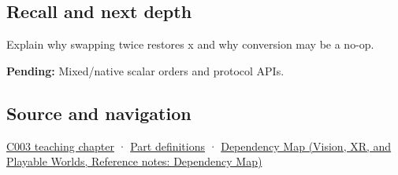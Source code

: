 \subsection{Recall and next depth}\label{appendix-11ba36693aa2-recall-and-next-depth}

Explain why swapping twice restores x and why conversion may be a no-op.

\textbf{Pending:} Mixed/native scalar orders and protocol APIs.

\subsection{Source and navigation}\label{appendix-11ba36693aa2-source-and-navigation}

\hyperref[01-foundations-i-ch002-where-the-bytes-live]{C003 teaching chapter} · \hyperref[appendix-fd090d982a15-m003---parts-41-60]{Part definitions} · \href{../07-Vision-XR-and-Playable-Worlds/main.pdf\#nameddest=appendix-4ad47bdd269a}{Dependency Map (Vision, XR, and Playable Worlds, Reference notes: Dependency Map)}
